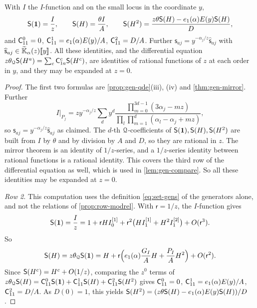 \begin{lem}
\label{lem:gen-rows}
With $I$ the $I$-function and on the small locus in the coordinate $y$,
\[
\mathsf{S}(\mathbf{1})=\frac{I}{z},\qquad\mathsf{S}(H)=\frac{\theta I}{A},\qquad\mathsf{S}(H^2)=\frac{z\theta\mathsf{S}(H)-e_1(\alpha)E(y)\mathsf{S}(H)}{D},
\]
and $\mathsf{C}^0_{11}=0$, $\mathsf{C}^1_{11}=e_1(\alpha)E(y)/A$, $\mathsf{C}^2_{11}=D/A$. Further $\mathsf{s}_{aj}=y^{-\alpha_j/z}\widehat{\mathsf{s}}_{aj}$ with $\widehat{\mathsf{s}}_{aj}\in\widetilde{\mathbb{K}}_{\alpha}(z)[\![ y ]\!]$. All these identities, and the differential equation $z\theta_{\mathcal{Q}}\mathsf{S}(H^a)=\sum_c\mathsf{C}^c_{1a}\mathsf{S}(H^c)$, are identities of rational functions of $z$ at each order in $y$, and they may be expanded at $z=0$.
\end{lem}
\begin{proof}
The first two formulas are \cref{prop:gen-qde}(iii), (iv) and \cref{thm:gen-mirror}. Further
\[
I|_{P_j}=zy^{-\alpha_j/z}\sum_dy^d\frac{\prod_{m=0}^{3d-1}(3\alpha_j-mz)}{\prod_l\prod_{m=1}^d(\alpha_l-\alpha_j+mz)},
\]
so $\mathsf{s}_{aj}=y^{-\alpha_j/z}\widehat{\mathsf{s}}_{aj}$ as claimed. The $d$-th $\mathcal{Q}$-coefficients of $\mathsf{S}(\mathbf{1}),\mathsf{S}(H),\mathsf{S}(H^2)$ are built from $I$ by $\theta$ and by division by $A$ and $D$, so they are rational in $z$. The mirror theorem is an identity of $1/z$-series, and a $1/z$-series identity between rational functions is a rational identity. This covers the third row of the differential equation as well, which is used in \cref{lem:gen-compare}. So all these identities may be expanded at $z=0$.

\emph{Row 2.} This computation uses the definition \cref{eq:set-gens} of the generators alone, and not the relations of \cref{prop:row-modrel}. With $\mathsf{r}=1/z$, the $I$-function gives
\[
\mathsf{S}(\mathbf{1})=\frac{I}{z}=1+\mathsf{r}HI_0^{[1]}+\mathsf{r}^2\big(HI_1^{[1]}+H^2I_1^{[2]}\big)+O(\mathsf{r}^3).
\]
So
\[
\mathsf{S}(H)=z\theta_{\mathcal{Q}}\mathsf{S}(\mathbf{1})=H+\mathsf{r}\Big(e_1(\alpha)\frac{G_I}{A}H+\frac{P_I}{A}H^2\Big)+O(\mathsf{r}^2).
\]
Since $\mathsf{S}(H^c)=H^c+O(1/z)$, comparing the $z^0$ terms of $z\theta_{\mathcal{Q}}\mathsf{S}(H)=\mathsf{C}^0_{11}\mathsf{S}(\mathbf{1})+\mathsf{C}^1_{11}\mathsf{S}(H)+\mathsf{C}^2_{11}\mathsf{S}(H^2)$ gives $\mathsf{C}^0_{11}=0$, $\mathsf{C}^1_{11}=e_1(\alpha)E(y)/A$, $\mathsf{C}^2_{11}=D/A$. As $D(0)=1$, this yields $\mathsf{S}(H^2)=(z\theta\mathsf{S}(H)-e_1(\alpha)E(y)\mathsf{S}(H))/D$. 
\end{proof}

